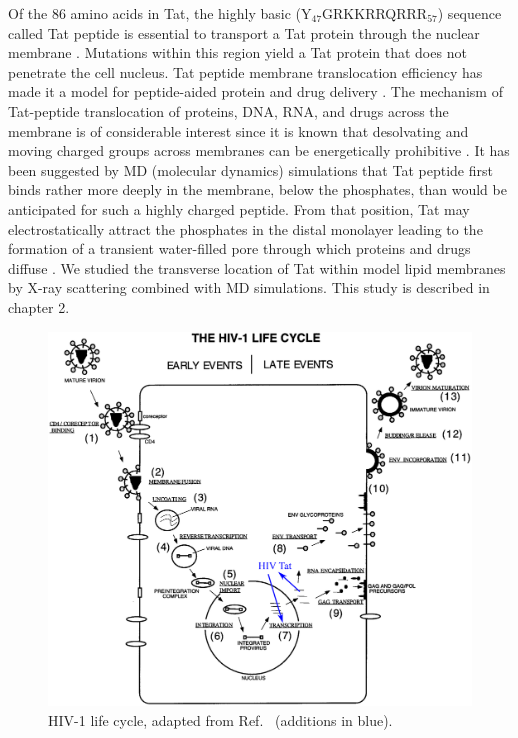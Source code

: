 Of the 86 amino acids in Tat,
the highly basic (Y$_{47}$GRKKRRQRRR$_{57}$) sequence called Tat peptide 
is essential to transport
a Tat protein through the nuclear membrane \cite{Ruben89,Hauber87}. 
Mutations within
this region yield a Tat protein that does not penetrate the cell 
nucleus. Tat peptide membrane translocation efficiency 
has made it a model for peptide-aided protein and drug delivery
\cite{Futaki01}. 
The mechanism of Tat-peptide translocation of proteins, 
DNA, RNA, and drugs across the membrane is of considerable interest
since it is known that desolvating and moving charged groups across membranes
can be energetically prohibitive \cite{Grabe04}. 
It has been suggested by \gls{MD} (molecular dynamics) simulations that Tat peptide first binds rather
more deeply in the membrane, below the phosphates, than
would be anticipated for such a highly charged peptide. From that position,
Tat may electrostatically attract the phosphates in the distal monolayer
leading to the formation of a transient water-filled pore through which
proteins and drugs diffuse \cite{Herce07}. 
We studied the transverse location of Tat within model lipid membranes 
by X-ray scattering
combined with MD simulations. This study is described in chapter 2.

\begin{figure}[htbp]
  \centering
  \includegraphics[width=\textwidth]{figures/HIV_lifecycle}
  \caption[HIV-1 life cycle, adapted from Ref.~\cite{Freed98}]
  {HIV-1 life cycle, adapted from Ref.~\cite{Freed98}
  (additions in blue).}
  \label{fig:HIV_lifecycle}
\end{figure}

